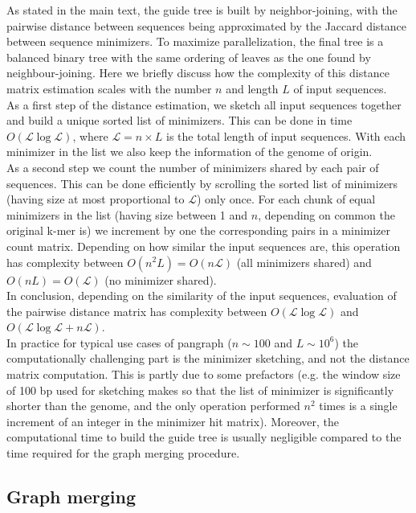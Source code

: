 \documentclass[aps,rmp,reprint,superscriptaddress,notitlepage,10pt,onecolumn]{revtex4-1}
\begin{document}
As stated in the main text, the guide tree is built by neighbor-joining, with the pairwise distance between sequences being approximated by the Jaccard distance between sequence minimizers. To maximize parallelization, the final tree is a balanced binary tree with the same ordering of leaves as the one found by neighbour-joining. Here we briefly discuss how the complexity of this distance matrix estimation scales with the number $n$ and length $L$ of input sequences.\\
As a first step of the distance estimation, we sketch all input sequences together and build a unique sorted list of minimizers. This can be done in time $O(\mathcal{L} \log \mathcal{L})$, where $\mathcal{L} = n \times L$ is the total length of input sequences. With each minimizer in the list we also keep the information of the genome of origin.\\
As a second step we count the number of minimizers shared by each pair of sequences. This can be done efficiently by scrolling the sorted list of minimizers (having size at most proportional to $\mathcal{L}$) only once. For each chunk of equal minimizers in the list (having size between 1 and $n$, depending on common the original k-mer is) we increment by one the corresponding pairs in a minimizer count matrix. Depending on how similar the input sequences are, this operation has complexity between $O(n^2 L) = O(n\mathcal{L})$ (all minimizers shared) and $O(nL) = O(\mathcal{L})$ (no minimizer shared).\\
In conclusion, depending on the similarity of the input sequences, evaluation of the pairwise distance matrix has complexity between $O(\mathcal{L} \log \mathcal{L})$ and $O(\mathcal{L} \log \mathcal{L} + n\mathcal{L})$.\\

In practice for typical use cases of pangraph ($n \sim 100$ and $L \sim 10^6$) the computationally challenging part is the minimizer sketching, and not the distance matrix computation. This is partly due to some prefactors (e.g. the window size of 100 bp used for sketching makes so that the list of minimizer is significantly shorter than the genome, and the only operation performed $n^2$ times is a single increment of an integer in the minimizer hit matrix). Moreover, the computational time to build the guide tree is usually negligible compared to the time required for the graph merging procedure.\\

\subsection{Graph merging}
\end{document}

